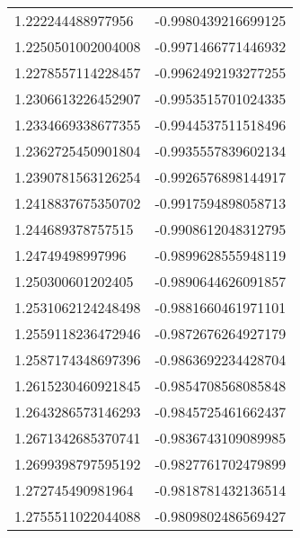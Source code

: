 \begin{supertabular}{ll}
1.222244488977956   & -0.9980439216699125   \\
1.2250501002004008  & -0.9971466771446932   \\
1.2278557114228457  & -0.9962492193277255   \\
1.2306613226452907  & -0.9953515701024335   \\
1.2334669338677355  & -0.9944537511518496   \\
1.2362725450901804  & -0.9935557839602134   \\
1.2390781563126254  & -0.9926576898144917   \\
1.2418837675350702  & -0.9917594898058713   \\
1.244689378757515   & -0.9908612048312795   \\
1.24749498997996    & -0.9899628555948119   \\
1.250300601202405   & -0.9890644626091857   \\
1.2531062124248498  & -0.9881660461971101   \\
1.2559118236472946  & -0.9872676264927179   \\
1.2587174348697396  & -0.9863692234428704   \\
1.2615230460921845  & -0.9854708568085848   \\
1.2643286573146293  & -0.9845725461662437   \\
1.2671342685370741  & -0.9836743109089985   \\
1.2699398797595192  & -0.9827761702479899   \\
1.272745490981964   & -0.9818781432136514   \\
1.2755511022044088  & -0.9809802486569427   \\
\end{supertabular}
